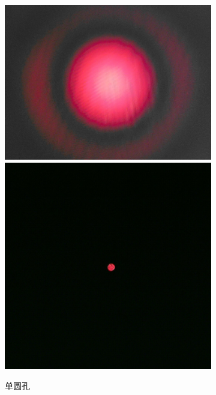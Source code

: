 \documentclass[a4paper]{article}
\begin{document}
\begin{figure}[H]
\begin{subfigure}[t]{0.3\textwidth}
        \centering
        \includegraphics[width=\textwidth]{fre-done/1-5.JPG}
        \includegraphics[width=\textwidth]{img-done/1-5.JPG}
        \caption{单圆孔}
        \label{1-5}
    \end{subfigure}
    \begin{subfigure}[t]{0.3\textwidth}
        \centering

\end{subfigure}
\end{figure}
\end{document}
